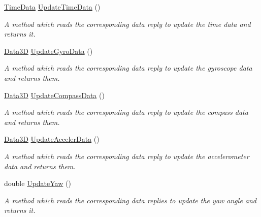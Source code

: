 \begin{DoxyCompactItemize}
\mbox{\label{classGPSInterface_a7294a8a32b9ed2f10c5eaae3cf289995}} 
\hyperlink{structTimeData}{Time\+Data} \hyperlink{classGPSInterface_a7294a8a32b9ed2f10c5eaae3cf289995}{Update\+Time\+Data} ()
\begin{DoxyCompactList}\small\item\em A method which reads the corresponding data reply to update the time data and returns it. \end{DoxyCompactList}\item 
\mbox{\label{classGPSInterface_a3eab2087c81b2847d08f6d2d1143ebf9}} 
\hyperlink{structData3D}{Data3D} \hyperlink{classGPSInterface_a3eab2087c81b2847d08f6d2d1143ebf9}{Update\+Gyro\+Data} ()
\begin{DoxyCompactList}\small\item\em A method which reads the corresponding data reply to update the gyroscope data and returns them. \end{DoxyCompactList}\item 
\mbox{\label{classGPSInterface_aa0dcab52fb85346bdac3037d042da7ff}} 
\hyperlink{structData3D}{Data3D} \hyperlink{classGPSInterface_aa0dcab52fb85346bdac3037d042da7ff}{Update\+Compass\+Data} ()
\begin{DoxyCompactList}\small\item\em A method which reads the corresponding data reply to update the compass data and returns them. \end{DoxyCompactList}\item 
\mbox{\label{classGPSInterface_ac80f02467033a37c5ed61317ec03fc6a}} 
\hyperlink{structData3D}{Data3D} \hyperlink{classGPSInterface_ac80f02467033a37c5ed61317ec03fc6a}{Update\+Acceler\+Data} ()
\begin{DoxyCompactList}\small\item\em A method which reads the corresponding data reply to update the accelerometer data and returns them. \end{DoxyCompactList}\item 
\mbox{\label{classGPSInterface_a31cc076fd378b133a8549644f0bc647d}} 
double \hyperlink{classGPSInterface_a31cc076fd378b133a8549644f0bc647d}{Update\+Yaw} ()
\begin{DoxyCompactList}\small\item\em A method which reads the corresponding data replies to update the yaw angle and returns it. \end{DoxyCompactList}\item 

\end{DoxyCompactItemize}
